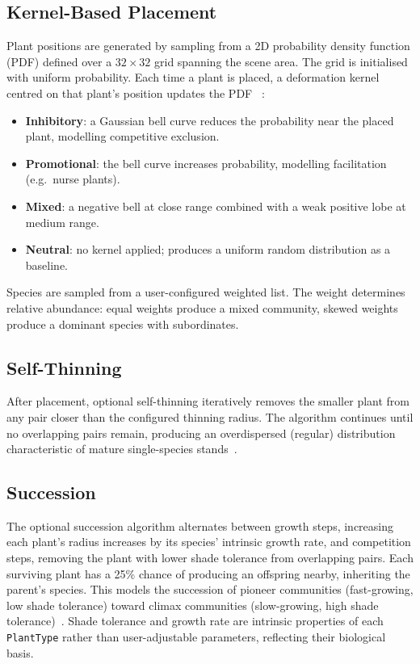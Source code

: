 \subsection{Kernel-Based Placement}

Plant positions are generated by sampling from a 2D probability density function (PDF) defined over a $32
\times 32$ grid spanning the scene area. The grid is initialised with uniform probability. Each time a plant
is placed, a deformation kernel centred on that plant's position updates the PDF
~\cite{laneGeneratingSpatialDistributions2002}:

\begin{itemize}
\item \textbf{Inhibitory}: a Gaussian bell curve reduces the probability near the placed plant, modelling
  competitive exclusion.
\item \textbf{Promotional}: the bell curve increases probability, modelling facilitation (e.g.\ nurse plants).
\item \textbf{Mixed}: a negative bell at close range combined with a weak positive lobe at medium range.
\item \textbf{Neutral}: no kernel applied; produces a uniform random distribution as a baseline.
\end{itemize}

Species are sampled from a user-configured weighted list. The weight determines relative abundance: equal
weights produce a mixed community, skewed weights produce a dominant species with subordinates.

\subsection{Self-Thinning}

After placement, optional self-thinning iteratively removes the smaller plant from any pair closer than the
configured thinning radius. The algorithm continues until no overlapping pairs remain, producing an
overdispersed (regular) distribution characteristic of mature single-species
stands~\cite{laneGeneratingSpatialDistributions2002}.

\subsection{Succession}

The optional succession algorithm alternates between growth steps, increasing each plant's radius increases
by its species' intrinsic growth rate, and competition steps, removing the plant with lower shade tolerance
from overlapping pairs. Each surviving plant has a 25\% chance of producing an offspring nearby, inheriting
the parent's species. This models the succession of pioneer communities (fast-growing, low shade tolerance)
toward climax communities (slow-growing, high shade tolerance)~\cite{laneGeneratingSpatialDistributions2002}.
Shade tolerance and growth rate are intrinsic properties of each \texttt{PlantType} rather than
user-adjustable parameters, reflecting their biological basis.

